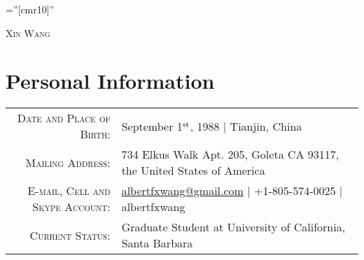 \documentclass[10pt]{article}
\begin{document}
\pagestyle{empty}    %
\font\fb=''[cmr10]'' %

\par{\centering
  {\huge \textsc{Xin Wang}}
\par}
\vspace{-1em}

\section{Personal Information}
\begin{tabular}{rl}
    \textsc{Date and Place of Birth:}       & September 1$^{\rm st}$, 1988  |  Tianjin, China \\
    \textsc{Mailing Address:} & 734 Elkus Walk Apt. 205, Goleta CA 93117, the United States of America \\
    \textsc{E-mail, Cell and Skype Account:}  & \href{mailto:albertfxwang@gmail.com}{albertfxwang@gmail.com}  |  +1-805-574-0025  |  albertfxwang \\
    \textsc{Current Status:}  & Graduate Student at University of California, Santa Barbara   \\
\end{tabular}


\end{document}
